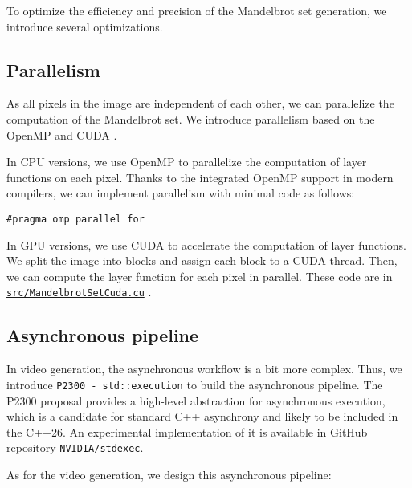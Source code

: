 To optimize the efficiency and precision of the Mandelbrot set generation, we introduce several optimizations.

\subsection{Parallelism}\label{subsec:parallelism}

As all pixels in the image are independent of each other, we can parallelize the computation of the Mandelbrot set.
We introduce parallelism based on the OpenMP and CUDA .

In CPU versions, we use OpenMP to parallelize the computation of layer functions on each pixel.
Thanks to the integrated OpenMP support in modern compilers, we can implement parallelism with minimal code as
follows:

\begin{lstlisting}[gobble=4, label={lst:openmp_parallel_for}]
    #pragma omp parallel for
\end{lstlisting}

In GPU versions, we use CUDA to accelerate the computation of layer functions.
We split the image into blocks and assign each block to a CUDA thread.
Then, we can compute the layer function for each pixel in parallel.
These code are in \href{https://github.com/AI1379/MandelbrotSet/blob/master/src/MandelbrotSetCuda.cu}
{\texttt{src/MandelbrotSetCuda.cu}} .

\subsection{Asynchronous pipeline}\label{subsec:asynchronous-pipeline}

In video generation, the asynchronous workflow is a bit more complex.
Thus, we introduce \texttt{P2300 - std::execution}\textsuperscript{\cite{P2300Proposal}}
to build the asynchronous pipeline.
The P2300 proposal provides a high-level abstraction for asynchronous execution, which is a candidate for standard
C++ asynchrony and likely to be included in the C++26.
An experimental implementation of it is available in GitHub repository
\texttt{NVIDIA/stdexec}\textsuperscript{\cite{stdexec}}.

As for the video generation, we design this asynchronous pipeline:

\vspace{0.5cm}

